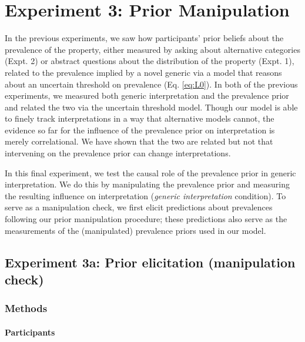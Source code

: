 \documentclass[,man,floatsintext]{apa6}
\let\oldparagraph\paragraph
\renewcommand{\paragraph}[1]{\oldparagraph{#1}\mbox{}}
\theoremstyle{definition}
\theoremstyle{definition}
\theoremstyle{definition}
\theoremstyle{remark}
\begin{document}
\hypertarget{experiment-3-prior-manipulation}{%
\section{Experiment 3: Prior
Manipulation}\label{experiment-3-prior-manipulation}}

In the previous experiments, we saw how participants' prior beliefs
about the prevalence of the property, either measured by asking about
alternative categories (Expt. 2) or abstract questions about the
distribution of the property (Expt. 1), related to the prevalence
implied by a novel generic via a model that reasons about an uncertain
threshold on prevalence (Eq. \ref{eq:L0}). In both of the previous
experiments, we measured both generic interpretation and the prevalence
prior and related the two via the uncertain threshold model. Though our
model is able to finely track interpretations in a way that alternative
models cannot, the evidence so far for the influence of the prevalence
prior on interpretation is merely correlational. We have shown that the
two are related but not that intervening on the prevalence prior can
change interpretations.

In this final experiment, we test the causal role of the prevalence
prior in generic interpretation. We do this by manipulating the
prevalence prior and measuring the resulting influence on interpretation
(\emph{generic interpretation} condition). To serve as a manipulation
check, we first elicit predictions about prevalences following our prior
manipulation procedure; these predictions also serve as the measurements
of the (manipulated) prevalence priors used in our model.

\hypertarget{experiment-3a-prior-elicitation-manipulation-check}{%
\subsection{Experiment 3a: Prior elicitation (manipulation
check)}\label{experiment-3a-prior-elicitation-manipulation-check}}

\hypertarget{methods-2}{%
\subsubsection{Methods}\label{methods-2}}

\hypertarget{participants-4}{%
\paragraph{Participants}\label{participants-4}}
\end{document}
